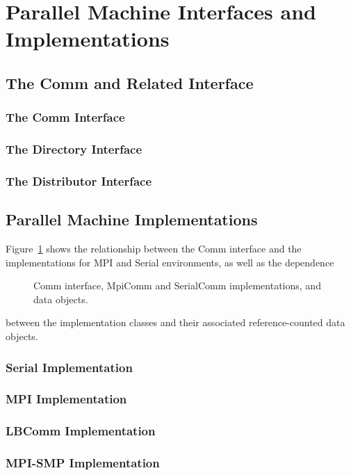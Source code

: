 \documentclass[12pt,relax]{PetraObjectModel}
\begin{document}
\section{Parallel Machine Interfaces and Implementations}

\subsection{The Comm and Related Interface}

\subsubsection{The Comm Interface}
\subsubsection{The Directory Interface}
\subsubsection{The Distributor Interface}

\subsection{Parallel Machine Implementations}
Figure~\ref{commfigure} shows the relationship between the Comm interface and
the implementations for MPI and Serial environments, as well as the dependence
\begin{figure}[ht]
\begin{center}
\caption{Comm interface, MpiComm and SerialComm implementations, and data objects.}
\label{commfigure}
\end{center}
\end{figure}
between the implementation classes and their associated reference-counted
data objects.

\subsubsection{Serial Implementation}
\subsubsection{MPI Implementation}
\subsubsection{LBComm Implementation}
\subsubsection{MPI-SMP Implementation}
\end{document}
